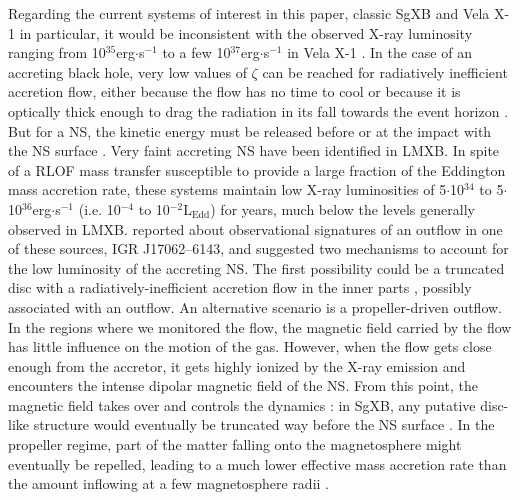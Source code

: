 \documentclass{aa}
\makeatletter
\newcommand{\sgx}{SgXB\xspace}
\newcommand*{\lmxb}{LMXB\@\xspace}
\newcommand*{\rlof}{RLOF\@\xspace}
\newcommand*{\ns}{NS\@\xspace}
\newcommand*{\eg}{e.g.\@\xspace}
\newcommand*{\ie}{i.e.\@\xspace}
\makeatother
\begin{document}
Regarding the current systems of interest in this paper, classic \sgx and Vela X-1 in particular, it would be inconsistent with the observed X-ray luminosity ranging from 10$^{35}$erg$\cdot$s$^{-1}$ to a few 10$^{37}$erg$\cdot$s$^{-1}$ in Vela X-1 \citep{Furst2010}. In the case of an accreting black hole, very low values of $\zeta$ can be reached for radiatively inefficient accretion flow, either because the flow has no time to cool or because it is optically thick enough to drag the radiation in its fall towards the event horizon \citep{Narayan1998}. But for a \ns, the kinetic energy must be released before or at the impact with the \ns surface \citep{Medvedev2000}. Very faint accreting \ns have been identified in \lmxb \citep{ArmasPadilla2013}. In spite of a \rlof mass transfer susceptible to provide a large fraction of the Eddington mass accretion rate, these systems maintain low X-ray luminosities of 5$\cdot$10$^{34}$ to 5$\cdot$10$^{36}$erg$\cdot$s$^{-1}$ (\ie 10$^{-4}$ to 10$^{-2}$L$_{\text{Edd}}$) for years, much below the levels generally observed in LMXB. \cite{Degenaar2017} reported about observational signatures of an outflow in one of these sources, IGR J17062–6143, and suggested two mechanisms to account for the low luminosity of the accreting \ns. The first possibility could be a truncated disc with a radiatively-inefficient accretion flow in the inner parts \citep[see \eg the adiabatic inflow-outflow solution derived by][]{Blandford1999}, possibly associated with an outflow. An alternative scenario is a propeller-driven outflow. In the regions where we monitored the flow, the magnetic field carried by the flow has little influence on the motion of the gas. However, when the flow gets close enough from the accretor, it gets highly ionized by the X-ray emission and encounters the intense dipolar magnetic field of the \ns. From this point, the magnetic field takes over and controls the dynamics : in \sgx, any putative disc-like structure would eventually be truncated way before the \ns surface \citep{Ghosh1978}. In the propeller regime, part of the matter falling onto the magnetosphere might eventually be repelled, leading to a much lower effective mass accretion rate than the amount inflowing at a few magnetosphere radii \citep{Illarionov1975,Bozzo2008}.
\end{document}
